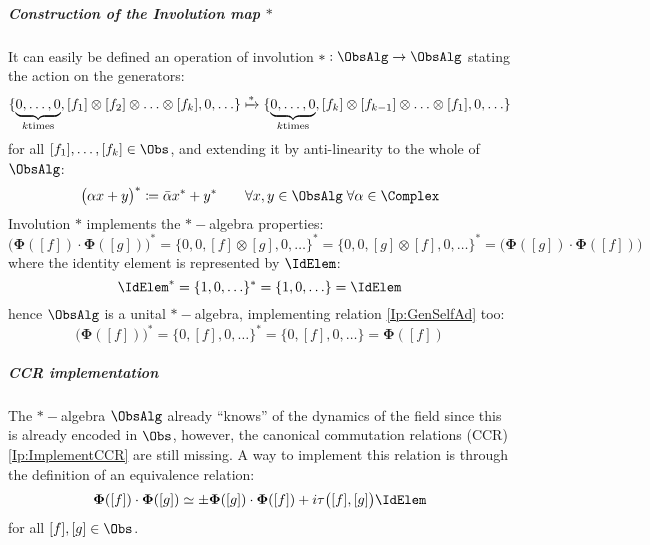 \documentclass[Main]{subfiles}
\begin{document}
   			\subparagraph{Construction of the Involution map $*$}
	   			It can easily be defined an operation of involution $*:\ObsAlg \rightarrow \ObsAlg$ stating the action on the generators:
				\begin{displaymath}
					\{ \underbrace{0,\ldots, 0}_{k \textrm{times}}, [f_1]\otimes [f_2] \otimes \ldots \otimes [f_k],0,\ldots \}
					\xmapsto{*}
					\{ \underbrace{0,\ldots, 0}_{k \textrm{times}}, [f_k]\otimes [f_{k-1}] \otimes \ldots \otimes [f_1],0,\ldots \}
				\end{displaymath}
				for all $[f_1],\ldots,[f_k] \in \Obs$, and extending it by anti-linearity to the whole of $\ObsAlg$:
				\begin{displaymath}
					\big( \alpha x + y \big)^* \coloneqq \bar{\alpha} x^* + y^* \qquad \forall x,y\in \ObsAlg \; \forall \alpha \in \Complex
				\end{displaymath}
				Involution $*$ implements the $\ast-$algebra properties:
				\begin{equation}
					\big( \mathbf{\Phi}([f]) \cdot \mathbf{\Phi}([g]) \big)^* = \big\{0,0,[f]\otimes [g],0,\ldots \big\}^* =
					\big\{0,0,[g]\otimes [f],0,\ldots \big\}^* = \big( \mathbf{\Phi}([g]) \cdot \mathbf{\Phi}([f]) \big)	
				\end{equation}
				where the identity element is represented by $\IdElem$:
				\begin{equation}
				\IdElem^* = \{1,0,\ldots\}^* =\{1,0,\ldots\}= \IdElem
				\end{equation}
				hence $\ObsAlg$ is a unital $\ast-$algebra, implementing relation \ref{Ip:GenSelfAd} too:
				\begin{displaymath}
					\big(\mathbf{\Phi}([f])\big)^* = \big\{ 0, [f],0,\ldots\big\}^* = \big\{ 0, [f],0,\ldots\big\} = \mathbf{\Phi}([f])
				\end{displaymath}			
   			\subparagraph{CCR implementation}
				The $\ast-$algebra $\ObsAlg$ already “knows” of the dynamics of the field since this is already encoded in $\Obs$, however, the canonical commutation relations (CCR) \ref{Ip:ImplementCCR} are still missing. 
   		 		A way to implement this relation is through the definition of an equivalence relation:
   		 			\begin{displaymath}
   		 				\mathbf{\Phi}([f]) \cdot \mathbf{\Phi}([g]) \simeq \pm \mathbf{\Phi}([g]) \cdot \mathbf{\Phi}([f]) + 
   		 				i \tau\big( [f], [g] \big) \IdElem
   		 			\end{displaymath}
   		 		for all $[f],[g] \in \Obs$.\\
\end{document}
